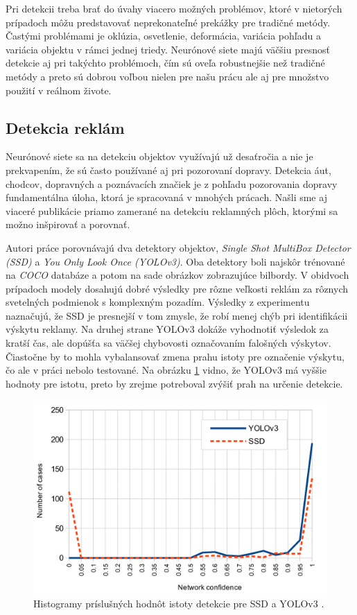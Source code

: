 Pri detekcii treba brať do úvahy viacero možných problémov, ktoré v nietorých prípadoch môžu predstavovať neprekonateľné prekážky pre tradičné metódy. Častými problémami je oklúzia, osvetlenie, deformácia, variácia pohľadu a variácia objektu v rámci jednej triedy. Neurónové siete majú väčšiu presnosť detekcie aj pri takýchto problémoch, čím sú oveľa robustnejšie než tradičné metódy a preto sú dobrou voľbou nielen pre našu prácu  ale aj pre množstvo použití v reálnom živote. 

\subsection{Detekcia reklám}

Neurónové siete sa na detekciu objektov využívajú už desaťročia a nie je prekvapením, že sú často používané aj pri pozorovaní dopravy. Detekcia áut, chodcov, dopravných a poznávacích značiek je z pohľadu pozorovania dopravy fundamentálna úloha, ktorá je spracovaná v mnohých prácach. Našli sme aj viaceré publikácie priamo zamerané na detekciu reklamných plôch, ktorými sa možno inšpirovať a porovnať.

Autori práce \cite{SSD-YOLO} porovnávajú dva detektory objektov, \textit{Single Shot MultiBox Detector (SSD)} a \textit{You Only Look Once (YOLOv3)}. Oba detektory boli najskôr trénované na \textit{COCO} databáze \cite{Coco} a potom na sade obrázkov zobrazujúce bilbordy. V obidvoch prípadoch modely dosahujú dobré výsledky pre rôzne veľkosti reklám za rôznych svetelných podmienok s komplexným pozadím. Výsledky z experimentu naznačujú, že SSD je presnejší v tom zmysle, že robí menej chýb pri identifikácii výskytu reklamy. Na druhej strane YOLOv3 dokáže vyhodnotiť výsledok za kratší čas, ale dopúšťa sa väčšej chybovosti označovaním falošných výskytov. Čiastočne by to mohla vybalansovať zmena prahu istoty pre označenie výskytu, čo ale v práci nebolo testované. Na obrázku \ref{img:ssd-yolo} vidno, že YOLOv3 má vyššie hodnoty pre istotu, preto by zrejme potreboval zvýšiť prah na určenie detekcie.
\begin{figure}[H]
    \centering
    \includegraphics[width=.6\textwidth]{images/01/ssd-yolo.png}
    \caption{Histogramy príslušných hodnôt istoty detekcie pre SSD a YOLOv3 \cite{SSD-YOLO}.}
    \label{img:ssd-yolo}
\end{figure}

